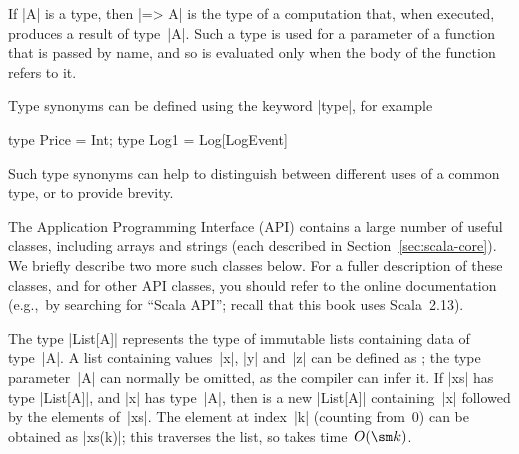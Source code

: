 If |A| is a type, then |=> A| is the type of a computation that, when
executed, produces a result of type~|A|.  Such a type is used for a parameter
of a function that is passed by name, and so is
evaluated only when the body of the function refers to it.



Type synonyms can be defined using the keyword |type|, for
example
\begin{scala}
  type Price = Int; type Log1 = Log[LogEvent]
\end{scala}
Such type synonyms can help to distinguish between different uses of a common
type, or to provide brevity. 


The Application Programming Interface (API) contains a large number
of useful classes, including arrays and strings (each described in
Section~\ref{sec:scala-core}).  We briefly describe two more such classes below.
For a fuller description of these classes, and for other API classes, you
should refer to the online documentation (e.g.,~by searching for ``Scala
API''; recall that this book uses Scala~2.13).

The type |List[A]| represents the type of immutable lists
containing data of type~|A|.
%
A list containing values~|x|, |y| and~|z| can be defined as ; the type parameter~|A| can normally be omitted, as the compiler can
infer it.
%
If |xs| has type |List[A]|, and |x| has type~|A|, then \ScalaIndex{::} is a new |List[A]| containing~|x| followed by the
elements of~|xs|. 
The element at index~|k| (counting from~0) can be
obtained as |xs(k)|; this traverses the list, so takes time~$O(\sm k)$.  

